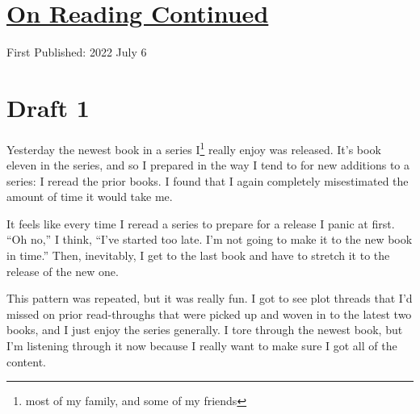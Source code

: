 \documentclass[12pt]{article}[titlepage]
\newcommand{\say}[1]{``#1''}
\newcommand{\1}{\={a}}
\newcommand{\2}{\={e}}
\newcommand{\3}{\={\i}}
\newcommand{\4}{\=o}
\newcommand{\5}{\=u}
\newcommand{\6}{\={A}}
\renewcommand{\,}{\textsuperscript{,}}
\begin{document}
\doublespacing
\section{\href{reading-3.html}{On Reading Continued}}
First Published: 2022 July 6

\section{Draft 1}
Yesterday the newest book in a series I\footnote{most of my family, and some of my friends} really enjoy was released.
It's book eleven in the series, and so I prepared in the way I tend to for new additions to a series: I reread the prior books.
I found that I again completely misestimated the amount of time it would take me.

It feels like every time I reread a series to prepare for a release I panic at first.
\say{Oh no,} I think, \say{I've started too late. I'm not going to make it to the new book in time.}
Then, inevitably, I get to the last book and have to stretch it to the release of the new one.

This pattern was repeated, but it was really fun.
I got to see plot threads that I'd missed on prior read-throughs that were picked up and woven in to the latest two books, and I just enjoy the series generally.
I tore through the newest book, but I'm listening through it now because I really want to make sure I got all of the content.
\end{document}
